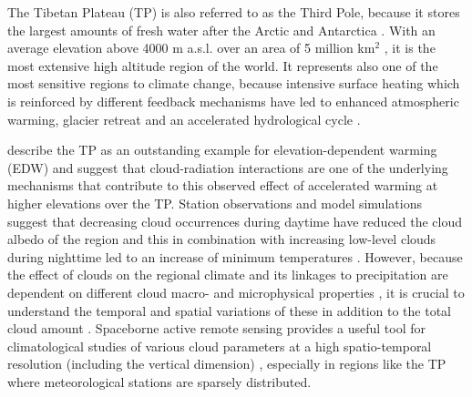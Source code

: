 \documentclass[alpha-refs]{wiley-article}
\begin{document}
The Tibetan Plateau (TP) is also referred to as the Third Pole, because it stores the largest amounts of fresh water after the Arctic and Antarctica \citep{yao2012TPE,yao2018recent}. With an average elevation above 4000 m a.s.l. over an area of 5 million km$^2$ \citep{yao2012TPE}, it is the most extensive high altitude region of the world. It represents also one of the most sensitive regions to climate change, because intensive surface heating which is reinforced by different feedback mechanisms have led to enhanced atmospheric warming, glacier retreat and an accelerated hydrological cycle \citep{bibi2018climatic}. 

\citet{EDW2015} describe the TP as an outstanding example for elevation-dependent warming (EDW) and \citet{EDW_tp2009} suggest that cloud-radiation interactions are one of the underlying mechanisms that contribute to this observed effect of accelerated warming at higher elevations over the TP. Station observations and model simulations suggest that decreasing cloud occurrences during daytime have reduced the cloud albedo of the region and this in combination with increasing low-level clouds during nighttime led to an increase of minimum temperatures \citep{duan2006changeclds}. However, because the effect of clouds on the regional climate and its linkages to precipitation are dependent on different cloud macro- and microphysical properties \citep{IPCC_cloudsaerosols}, it is crucial to understand the temporal and spatial variations of these in addition to the total cloud amount \citep{cl15_2}. Spaceborne active remote sensing provides a useful tool for climatological studies of various cloud parameters at a high spatio-temporal resolution (including the vertical dimension) \citep{stephens2002cloudsat}, especially in regions like the TP where meteorological stations are sparsely distributed.
\end{document}
